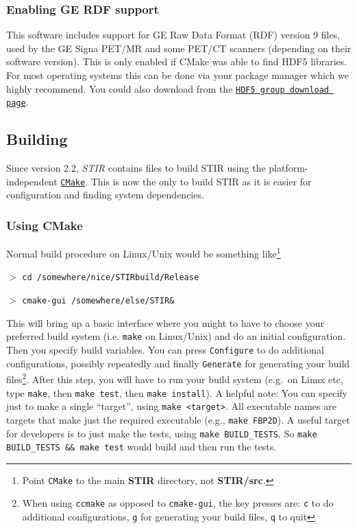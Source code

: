 \documentclass{article}
\def\url#1#2{\mbox{\href{#1}{\tt #2}}}
\newcommand{\cmdline}[1]{\par \noindent $>$ \texttt{#1}\par}
\begin{document}
\subsubsection{
Enabling GE RDF  support}
\label{sec:RDFsupport}
This software includes support for GE Raw Data Format (RDF) version 9 files, used
by the GE Signa PET/MR and some PET/CT scanners (depending on their software version). This is only enabled if CMake was able to find HDF5 libraries.
For most operating systems this can be done via your package manager which we highly recommend. You could also
download from the \url{https://www.hdfgroup.org/downloads/hdf5/}{HDF5 group download page}.

\subsection{
Building}
Since version 2.2, \textit{STIR} contains files to build STIR using the platform-independent
\url{"http://www.cmake.org"}{CMake}. This is now the only to build STIR as
it is easier for configuration and finding system dependencies.
\subsubsection{
Using CMake}
\label{sec:UsingCMake}

Normal build procedure on Linux/Unix would be something like\footnote{Point \texttt{CMake} to the main \textbf{STIR}
directory, not \textbf{STIR/src}.}

\cmdline{cd /somewhere/nice/STIRbuild/Release}
\cmdline{cmake-gui /somewhere/else/STIR\&}

This will bring up a basic interface where you might to have to choose your preferred
build system (i.e. \texttt{make} on Linux/Unix) and do an initial configuration. Then 
you specify build variables. You can press \texttt{Configure} to do additional configurations,
possibly repeatedly and finally \texttt{Generate} for generating your build files\footnote{
When using \texttt{ccmake} as opposed to \texttt{cmake-gui}, the key presses are:
\texttt{c} to do additional configurations, \texttt{g} for generating
your build files, \texttt{q} to quit}. After this step, you will have to run your build system (e.g.\ on Linux etc,
type \texttt{make}, then \texttt{make test}, then \texttt{make install}).
A helpful note: You can specify just to make a single ``target'',
using \texttt{make <target>}. All executable names are targets that
make just the required executable (e.g., \texttt{make FBP2D}). A
useful target for developers is to just make the tests, using
\texttt{make BUILD\_TESTS}. So \texttt{make BUILD\_TESTS \&\& make test}
would build and then run the tests.
\end{document}
